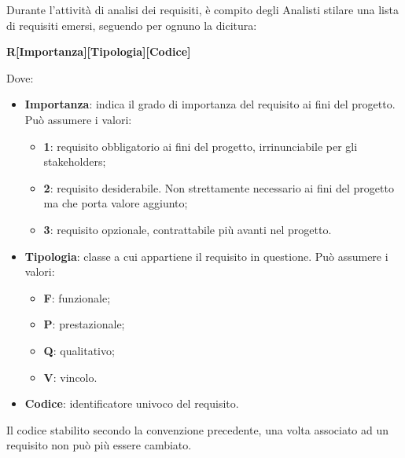                	Durante l'attività di analisi dei requisiti, è compito degli Analisti stilare una lista di requisiti emersi, seguendo per ognuno la dicitura:
                    \begin{center}
                    \textbf{R[Importanza][Tipologia][Codice]}
                    \end{center}
                    
                    Dove:
                    \begin{itemize}
                        	\item{\textbf{Importanza}: indica il grado di importanza del requisito ai fini del progetto. Può assumere i valori:}
                        	\begin{itemize}
                                	\item{\textbf{1}: requisito obbligatorio ai fini del progetto, irrinunciabile per gli stakeholders;}
                                	\item{\textbf{2}: requisito desiderabile. Non strettamente necessario ai fini del progetto ma che porta valore aggiunto;}
                                	\item{\textbf{3}: requisito opzionale, contrattabile più avanti nel progetto.}
                        	\end{itemize}
                        	\item{\textbf{Tipologia}: classe a cui appartiene il requisito in questione. Può assumere i valori:}
                        	\begin{itemize}
                        		\item{\textbf{F}: funzionale;}
                        		\item{\textbf{P}: prestazionale;}
                        		\item{\textbf{Q}: qualitativo;}
                        		\item{\textbf{V}: vincolo.}
                        	\end{itemize}
                        	\item{\textbf{Codice}: identificatore univoco del requisito}.
                    \end{itemize}
                    
                    Il codice stabilito secondo la convenzione precedente, una volta associato ad un requisito non può più essere cambiato.
                    
